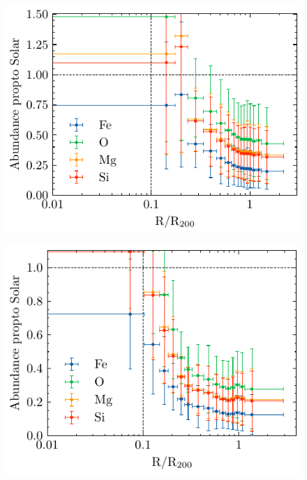 \documentclass[main.tex]{subfiles}
\begin{document}
	\begin{figure}[htbp]
		\centering
		\begin{minipage}[b]{0.45\linewidth}
			\centering
			\includegraphics[width=\linewidth]{pic/abundance_profile388544}
			\label{fig:abundanceprofile388544}
		\end{minipage}
		\begin{minipage}[b]{0.45\linewidth}
			\centering
			\includegraphics[width=\linewidth]{pic/abundance_profile421555}
			\label{fig:abundanceprofile421555}
		\end{minipage}
		\caption{}
		\label{}
		
	\end{figure}
\end{document}
